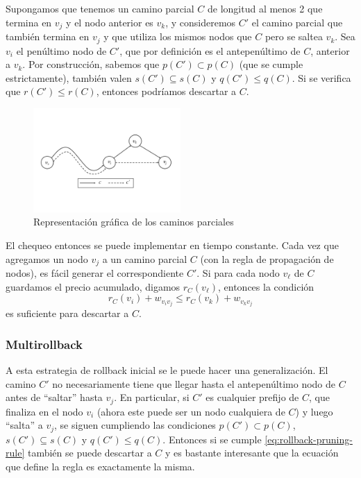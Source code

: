 Supongamos que tenemos un camino parcial $C$ de longitud al menos 2 que termina en $v_j$ y el nodo anterior es $v_k$, y consideremos $C'$ el camino parcial que también termina en $v_j$ y que utiliza los mismos nodos que $C$ pero se saltea $v_k$. Sea $v_i$ el penúltimo nodo de $C'$, que por definición es el antepenúltimo de $C$, anterior a $v_k$. Por construcción, sabemos que $p(C') \subset p(C)$ (que se cumple estrictamente), también valen $s(C') \subseteq s(C)$ y $q(C') \leq q(C)$. Si se verifica que $r(C') \leq r(C)$, entonces podríamos descartar a $C$.

\begin{figure}[H]
\centering
\includegraphics[width=0.5\textwidth]{img/rollback_pruning.jpg}
\caption{Representación gráfica de los caminos parciales}
\label{fig:rollback-pruning}
\centering
\end{figure}

El chequeo entonces se puede implementar en tiempo constante. Cada vez que agregamos un nodo $v_j$ a un camino parcial $C$ (con la regla de propagación de nodos), es fácil generar el correspondiente $C'$. Si para cada nodo $v_{\ell}$ de $C$ guardamos el precio acumulado, digamos $r_C(v_{\ell})$, entonces la condición
\begin{equation}
\label{eq:rollback-pruning-rule}
    r_C(v_i) + w_{v_i v_j} \leq r_C(v_k) + w_{v_k v_j}
\end{equation}
es suficiente para descartar a $C$. 

\subsubsection{Multirollback}

A esta estrategia de rollback inicial se le puede hacer una generalización. El camino $C'$ no necesariamente tiene que llegar hasta el antepenúltimo nodo de $C$ antes de ``saltar'' hasta $v_j$. En particular, si $C'$ es cualquier prefijo de $C$, que finaliza en el nodo $v_i$ (ahora este puede ser un nodo cualquiera de $C$) y luego ``salta'' a $v_j$, se siguen cumpliendo las condiciones $p(C') \subset p(C)$, $s(C') \subseteq s(C)$ y $q(C') \leq q(C)$. Entonces si se cumple \ref{eq:rollback-pruning-rule} también se puede descartar a $C$ y es bastante interesante que la ecuación que define la regla es exactamente la misma. 


